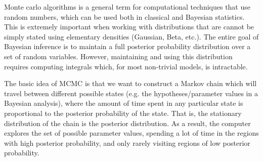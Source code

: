 Monte carlo algorithms is a general term for computational techniques that use random numbers, which can be used both in classical and Bayesian statistics. This is extremely important when working with distributions that are cannot be simply stated using elementary densities (Gaussian, Beta, etc.). The entire goal of Bayesian inference is to maintain a full posterior probability distribution over a set of random variables. However, maintaining and using this distribution requires computing integrals which, for most non-trivial models, is intractable.

The basic idea of MCMC is that we want to construct a Markov chain which will travel between different possible states (e.g. the hypotheses/parameter values in a Bayesian analysis), where the amount of time spent in any particular state is proportional to the posterior probability of the state. That is, the stationary distribution of the chain is the posterior distribution. As a result, the computer explores the set of possible parameter values, spending a lot of time in the regions with high posterior probability, and only rarely visiting regions of low posterior probability.

